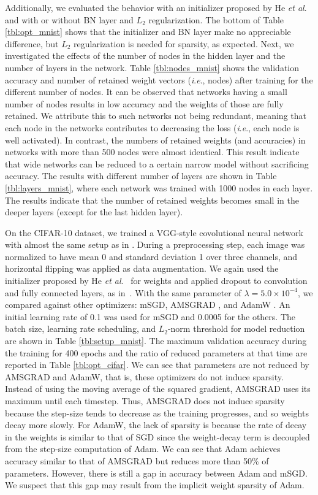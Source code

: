 \documentclass[conference]{IEEEtran}
\newcommand{\etal}{\textit{et al}.}
\newcommand{\ie}{\textit{i}.\textit{e}.}
\begin{document}
Additionally, we evaluated the behavior with an initializer proposed by He \etal~\cite{He_2015} and with or without BN layer and $L_2$ regularization.
The bottom of Table \ref{tbl:opt_mnist} shows that the initializer and BN layer make no appreciable difference, but $L_2$ regularization is needed for sparsity, as expected. 
Next, we investigated the effects of the number of nodes in the hidden layer and the number of layers in the network.
Table \ref{tbl:nodes_mnist} shows the validation accuracy and number of retained weight vectors (\ie, nodes) after training for the different number of nodes. 
It can be observed that networks having a small number of nodes results in low accuracy and the weights of those are fully retained. 
We attribute this to such networks not being redundant, meaning that each node in the networks contributes to decreasing the loss (\ie, each node is well activated). In contrast, the numbers of retained weights (and accuracies) in networks with more than 500 nodes were almost identical. 
This result indicate that wide networks can be reduced to a certain narrow model without sacrificing accuracy. 
The results with different number of layers are shown in Table \ref{tbl:layers_mnist}, 
where each network was trained with 1000 nodes in each layer. 
The results indicate that the number of retained weights becomes small in the deeper layers (except for the last hidden layer). 

On the CIFAR-10 dataset, we trained a VGG-style covolutional neural network with almost the same setup as in \cite{github}. 
During a preprocessing step, each image was normalized to have mean 0 and standard deviation 1 over three channels, and horizontal flipping was applied as data augmentation. 
We again used the initializer proposed by He \etal~\cite{He_2015} for weights and applied dropout \cite{Srivastava_2014} to convolution and fully connected layers, as in~\cite{github}. 
With the same parameter of $\lambda = 5.0 \times 10^{-4}$, we compared against other optimizers: mSGD, AMSGRAD \cite{Reddi_2018}, and AdamW \cite{Loshchilov_2017}. 
An initial learning rate of 0.1 was used for mSGD and 0.0005 for the others.
The batch size, learning rate scheduling, and $L_2$-norm threshold for model reduction are shown in Table \ref{tbl:setup_mnist}.
The maximum validation accuracy during the training for 400 epochs and the ratio of reduced parameters at that time are reported in Table \ref{tbl:opt_cifar}.
We can see that parameters are not reduced by AMSGRAD and AdamW, that is, these optimizers do not induce sparsity.
Instead of using the moving average of the squared gradient, AMSGRAD uses its maximum until each timestep. 
Thus, AMSGRAD does not induce sparsity because the step-size tends to decrease as the training progresses, and so weights decay more slowly. 
For AdamW, the lack of sparsity is because the rate of decay in the weights is similar to that of SGD since the weight-decay term is decoupled from the step-size computation of Adam.
We can see that Adam achieves accuracy similar to that of AMSGRAD but reduces more than 50\% of parameters.
However, there is still a gap in accuracy between Adam and mSGD.
We suspect that this gap may result from the implicit weight sparsity of Adam. 
\end{document}
